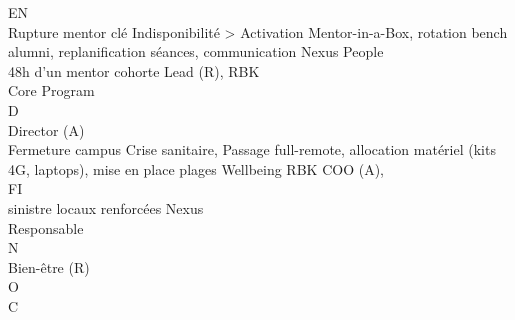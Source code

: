 \vspace{0.5em}
\vspace{0.5em}
\vspace{0.5em}
\vspace{0.5em}
EN\\
Rupture mentor clé Indisponibilité \textgreater{}   Activation Mentor-in-a-Box, rotation bench alumni, replanification séances, communication Nexus People\\
48h d’un mentor     cohorte                                                                                       Lead (R), RBK\\
Core                                                                                                              Program\\
\vspace{0.5em}
\vspace{0.5em}
\vspace{0.5em}
\vspace{0.5em}
D\\
Director (A)\\
Fermeture campus Crise sanitaire,      Passage full-remote, allocation matériel (kits 4G, laptops), mise en place plages Wellbeing RBK COO (A),\\
\vspace{0.5em}
\vspace{0.5em}
\vspace{0.5em}
FI\\
sinistre locaux       renforcées                                                                                    Nexus\\
Responsable\\
N\\
Bien-être (R)\\
O\\
C\\
\vspace{0.5em}
